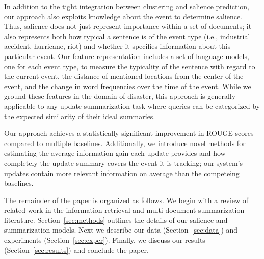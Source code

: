 In addition to the tight integration between clustering and salience
prediction, our approach also exploits knowledge about the event to determine
salience. Thus, salience does not just represent importance within a set of
documents; it also represents both how typical a sentence is of the  
event
type (i.e., industrial accident, hurricane, riot) and whether it specifies 
information
about this particular event. 
Our feature representation includes a set of language models, one for each
event type, to measure the typicality of the sentence with regard to the 
current event, the distance of mentioned locations from the center of
the event, and the change in word frequencies over the time of the event.
While we ground these features in the domain of disaster, this approach is generally applicable to any update summarization task where queries can be categorized by the 
expected similarity of their ideal summaries.

Our approach achieves a statistically significant improvement in 
 ROUGE scores compared to multiple baselines.
Additionally, we introduce novel methods for estimating the average information
gain each update provides and how completely the update summary covers 
the event it is tracking; our system's updates contain more relevant
information on average than the competeing baselines.


The remainder of the paper is organized as follows.
We begin with a review of related work
in the information retrieval and multi-document
summarization literature. Section~\ref{sec:methods} outlines the details
of our salience and summarization models. Next we describe our
data (Section~\ref{sec:data}) and experiments (Section~\ref{sec:exper}). Finally,
we discuss our results (Section~\ref{sec:results}) and conclude the paper.




